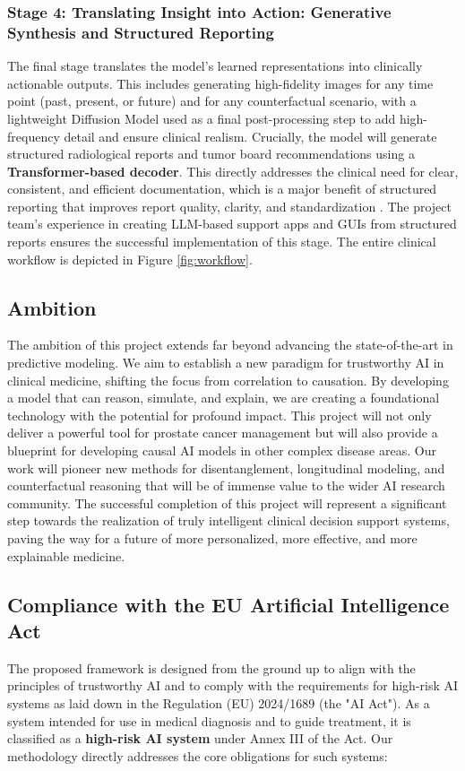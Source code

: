 \documentclass[11pt, a4paper]{article}
\begin{document}
\subsubsection{Stage 4: Translating Insight into Action: Generative Synthesis and Structured Reporting}
The final stage translates the model's learned representations into clinically actionable outputs. This includes generating high-fidelity images for any time point (past, present, or future) and for any counterfactual scenario, with a lightweight Diffusion Model used as a final post-processing step to add high-frequency detail and ensure clinical realism. Crucially, the model will generate structured radiological reports and tumor board recommendations using a \textbf{Transformer-based decoder}. This directly addresses the clinical need for clear, consistent, and efficient documentation, which is a major benefit of structured reporting that improves report quality, clarity, and standardization \cite{JorgHalfmann2023, SacoranskyKwan2024}. The project team's experience in creating LLM-based support apps and GUIs from structured reports ensures the successful implementation of this stage. The entire clinical workflow is depicted in Figure \ref{fig:workflow}.

\subsection{Ambition}
The ambition of this project extends far beyond advancing the state-of-the-art in predictive modeling. We aim to establish a new paradigm for trustworthy AI in clinical medicine, shifting the focus from correlation to causation. By developing a model that can reason, simulate, and explain, we are creating a foundational technology with the potential for profound impact. This project will not only deliver a powerful tool for prostate cancer management but will also provide a blueprint for developing causal AI models in other complex disease areas. Our work will pioneer new methods for disentanglement, longitudinal modeling, and counterfactual reasoning that will be of immense value to the wider AI research community. The successful completion of this project will represent a significant step towards the realization of truly intelligent clinical decision support systems, paving the way for a future of more personalized, more effective, and more explainable medicine.

\subsection{Compliance with the EU Artificial Intelligence Act}
The proposed framework is designed from the ground up to align with the principles of trustworthy AI and to comply with the requirements for high-risk AI systems as laid down in the Regulation (EU) 2024/1689 (the "AI Act"). As a system intended for use in medical diagnosis and to guide treatment, it is classified as a \textbf{high-risk AI system} under Annex III of the Act. Our methodology directly addresses the core obligations for such systems:
\end{document}
